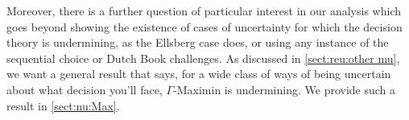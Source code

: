 \documentclass[a4paper]{article}
\renewcommand\P{\mathbb{P}} %
\newcommand\EU{\mathrm{EU}}
\newcommand{\IP}{\P}
\newcommand{\todoold}[2][]{\todo[backgroundcolor=white,bordercolor=orange!10,linecolor=gray!10, #1,caption={},textcolor=gray]{Pre-rev: #2}}
\newcommand{\todooldinfo}[2][]{\todoold[#1]{#2}}
\newenvironment{CCM rewritten}
{\begingroup\color{blue}} %
{\endgroup}              %
\begin{document}
{
\label{sect:gamma:other mu}

Moreover, there is a further question of particular interest in our analysis which goes beyond showing the existence of cases of uncertainty for which the decision theory is undermining, as the Ellsberg case does, or using any instance of the sequential choice or Dutch Book challenges. As discussed in \cref{sect:reu:other mu}, we want a general result that says, for a wide class of ways of being uncertain about what decision you'll face, $\Gamma$-Maximin is undermining. We provide such a result in \cref{sect:nu:Max}.



}

\end{document}
